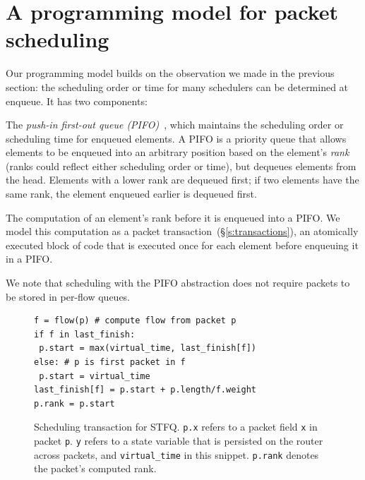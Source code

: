 \section{A programming model for packet scheduling}
\label{s:pifo}

Our programming model builds on the observation we made in the previous
section: the scheduling order or time for many schedulers can be determined at
enqueue. It has two components:
\begin{CompactEnumerate}
\item The {\em push-in first-out queue (PIFO)}~\cite{pifo}, which maintains the
scheduling order or scheduling time for enqueued elements. A PIFO is a priority
queue that allows elements to be enqueued into an arbitrary position based on
the element's {\em rank} (ranks could reflect either scheduling order or time),
but dequeues elements from the head. Elements with a lower rank are dequeued
first; if two elements have the same rank, the element enqueued earlier is
dequeued first.

\item The computation of an element's rank before it is enqueued into
  a PIFO. We model this computation as a packet
    transaction~(\S\ref{s:transactions}), an atomically executed block
  of code that is executed once for each element before enqueuing it
  in a PIFO.
\end{CompactEnumerate}

We note that scheduling with the PIFO abstraction does not require packets to
be stored in per-flow queues.

\begin{figure}
\begin{lstlisting}[style=customc]
f = flow(p) # compute flow from packet p
if f in last_finish:
 p.start = max(virtual_time, last_finish[f])
else: # p is first packet in f
 p.start = virtual_time
last_finish[f] = p.start + p.length/f.weight
p.rank = p.start
\end{lstlisting}
\caption{Scheduling transaction for STFQ. {\tt p.x} refers to a packet
  field {\tt x} in packet {\tt p}.  {\tt y} refers to a state variable
  that is persisted on the router across packets, 
  and {\tt virtual\_time} in this snippet. {\tt p.rank} denotes the
  packet's computed rank.}
\label{fig:sched_trans}
\end{figure}

